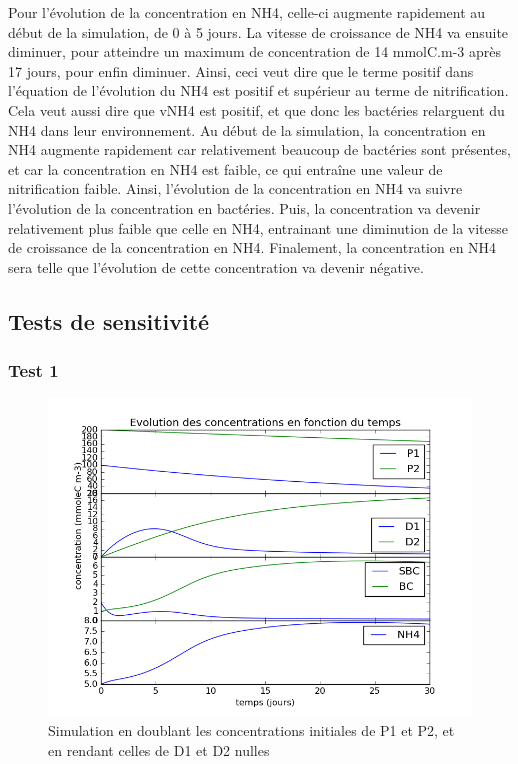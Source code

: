 \par{
Pour l'\'evolution de la concentration en NH4, celle-ci augmente rapidement au d\'ebut de la simulation, de 0 \`a 5 jours. La vitesse de croissance de NH4 va ensuite diminuer, pour atteindre un maximum de concentration de 14 mmolC.m-3 apr\`es 17 jours, pour enfin diminuer. Ainsi, ceci veut dire que le terme positif dans l'\'equation de l'\'evolution du NH4 est positif et sup\'erieur au terme de nitrification. Cela veut aussi dire que vNH4 est positif, et que donc les bact\'eries relarguent du NH4 dans leur environnement. Au d\'ebut de la simulation, la concentration en NH4 augmente rapidement car relativement beaucoup de bact\'eries sont pr\'esentes, et car la concentration en NH4 est faible, ce qui entra\^ine une valeur de nitrification faible. Ainsi, l'\'evolution de la concentration en NH4 va suivre l'\'evolution de la concentration en bact\'eries. Puis, la concentration va devenir relativement plus faible que celle en NH4, entrainant une diminution de la vitesse de croissance de la concentration en NH4. Finalement, la concentration en NH4 sera telle que l'\'evolution de cette concentration va devenir n\'egative.
}

\FloatBarrier
\newpage

\subsection{Tests de sensitivit\'e}
\subsubsection{Test 1}

\begin{figure}[h!]
  \includegraphics[width=\textwidth]{partie2/Test1.png}
  \caption{Simulation en doublant les concentrations initiales de P1 et P2, et en rendant celles de D1 et D2 nulles
  }
  \label{fig:partie2test1}
\end{figure}

